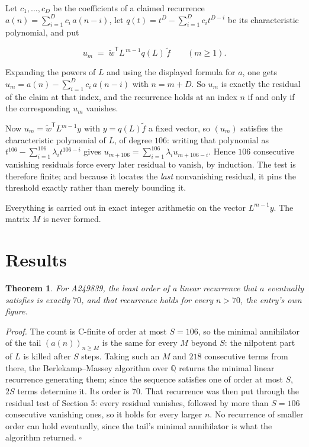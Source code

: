 \documentclass[11pt]{article}
\newtheorem{theorem}{Theorem}
\theoremstyle{definition}
\begin{document}
Let $c_1,\dots,c_D$ be the coefficients of a claimed recurrence $a(n) = \sum_{i=1}^{D} c_i\,a(n-i)$, let $q(t) = t^{D} - \sum_{i=1}^{D} c_i t^{D-i}$ be its characteristic polynomial, and put

\[u_m \;=\; \tilde w^{\mathsf T} L^{\,m-1} q(L)\,\tilde f \qquad (m \ge 1).\]

Expanding the powers of $L$ and using the displayed formula for $a$, one gets $u_m = a(n) - \sum_{i=1}^{D} c_i\,a(n-i)$ with $n = m + D$. So $u_m$ is exactly the residual of the claim at that index, and the recurrence holds at an index $n$ if and only if the corresponding $u_m$ vanishes.

Now $u_m = \tilde w^{\mathsf T} L^{m-1} y$ with $y = q(L)\tilde f$ a fixed vector, so $(u_m)$ satisfies the characteristic polynomial of $L$, of degree $106$: writing that polynomial as $t^{106} - \sum_{i=1}^{106} \lambda_i t^{106-i}$ gives $u_{m+106} = \sum_{i=1}^{106} \lambda_i u_{m+106-i}$. Hence $106$ consecutive vanishing residuals force every later residual to vanish, by induction. The test is therefore finite; and because it locates the {\itshape last} nonvanishing residual, it pins the threshold exactly rather than merely bounding it.

Everything is carried out in exact integer arithmetic on the vector $L^{m-1}y$. The matrix $M$ is never formed.

\section{Results}

\begin{theorem} For A249839, the least order of a linear recurrence that $a$ eventually satisfies is exactly $70$, and that recurrence holds for every $n > 70$, the entry's own figure.\end{theorem}

{\itshape Proof.} The count is C-finite of order at most $S = 106$, so the minimal annihilator of the tail $(a(n))_{n \ge M}$ is the same for every $M$ beyond $S$: the nilpotent part of $L$ is killed after $S$ steps. Taking such an $M$ and $218$ consecutive terms from there, the Berlekamp--Massey algorithm over $\mathbb{Q}$ returns the minimal linear recurrence generating them; since the sequence satisfies one of order at most $S$, $2S$ terms determine it. Its order is $70$. That recurrence was then put through the residual test of Section 5: every residual vanishes, followed by more than $S = 106$ consecutive vanishing ones, so it holds for every larger $n$. No recurrence of smaller order can hold eventually, since the tail's minimal annihilator is what the algorithm returned. $\square$
\end{document}
